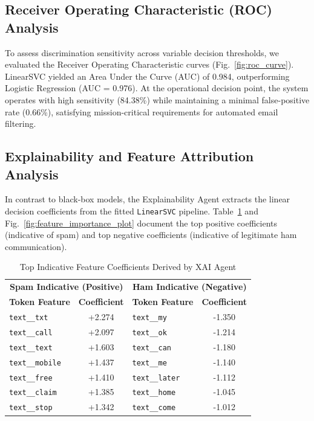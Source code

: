 \documentclass[conference]{IEEEtran}
\begin{document}
\subsection{Receiver Operating Characteristic (ROC) Analysis}
To assess discrimination sensitivity across variable decision thresholds, we evaluated the Receiver Operating Characteristic curves (Fig.~\ref{fig:roc_curve}). LinearSVC yielded an Area Under the Curve (AUC) of 0.984, outperforming Logistic Regression (AUC = 0.976). At the operational decision point, the system operates with high sensitivity (84.38\%) while maintaining a minimal false-positive rate (0.66\%), satisfying mission-critical requirements for automated email filtering.

\subsection{Explainability and Feature Attribution Analysis}
In contrast to black-box models, the Explainability Agent extracts the linear decision coefficients from the fitted \texttt{LinearSVC} pipeline. Table~\ref{tab:feature_coefficients} and Fig.~\ref{fig:feature_importance_plot} document the top positive coefficients (indicative of spam) and top negative coefficients (indicative of legitimate ham communication).

\begin{table}[htbp]
\caption{Top Indicative Feature Coefficients Derived by XAI Agent}
\label{tab:feature_coefficients}
\centering
\small
\begin{tabularx}{\columnwidth}{@{}lc|lc@{}}
\toprule
\multicolumn{2}{c|}{\textbf{Spam Indicative (Positive)}} & \multicolumn{2}{c}{\textbf{Ham Indicative (Negative)}} \\
\textbf{Token Feature} & \textbf{Coefficient} & \textbf{Token Feature} & \textbf{Coefficient} \\
\midrule
\texttt{text\_\_txt} & +2.274 & \texttt{text\_\_my} & -1.350 \\
\texttt{text\_\_call} & +2.097 & \texttt{text\_\_ok} & -1.214 \\
\texttt{text\_\_text} & +1.603 & \texttt{text\_\_can} & -1.180 \\
\texttt{text\_\_mobile} & +1.437 & \texttt{text\_\_me} & -1.140 \\
\texttt{text\_\_free} & +1.410 & \texttt{text\_\_later} & -1.112 \\
\texttt{text\_\_claim} & +1.385 & \texttt{text\_\_home} & -1.045 \\
\texttt{text\_\_stop} & +1.342 & \texttt{text\_\_come} & -1.012 \\
\bottomrule
\end{tabularx}
\end{table}
\end{document}
